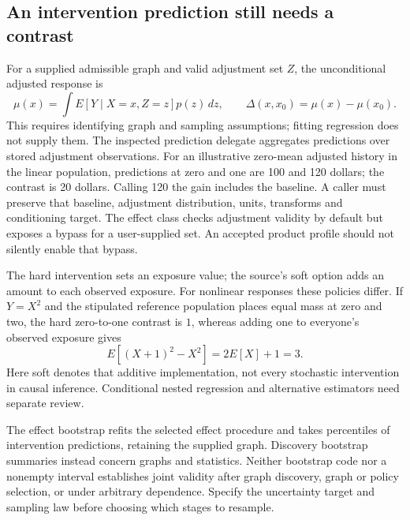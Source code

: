 \subsection{An intervention prediction still needs a contrast}
\label{exec23:tigramite-intervention}
For a supplied admissible graph and valid adjustment set $Z$, the unconditional adjusted response is
\begin{equation}
 \mu(x)=\int E[Y\mid X=x,Z=z]p(z)\,dz,\qquad
 \Delta(x,x_0)=\mu(x)-\mu(x_0).
 \label{exec23:tigramite-contrast}
\end{equation}
This requires identifying graph and sampling assumptions; fitting regression does not supply them. The inspected prediction delegate aggregates predictions over stored adjustment observations. For an illustrative zero-mean adjusted history in the linear population, predictions at zero and one are 100 and 120 dollars; the contrast is 20 dollars. Calling 120 the gain includes the baseline. A caller must preserve that baseline, adjustment distribution, units, transforms and conditioning target. The effect class checks adjustment validity by default but exposes a bypass for a user-supplied set. An accepted product profile should not silently enable that bypass. \cite{exec23_tigramite_reuse_source,exec23_tigramite_reference}

The hard intervention sets an exposure value; the source's soft option adds an amount to each observed exposure. For nonlinear responses these policies differ. If $Y=X^2$ and the stipulated reference population places equal mass at zero and two, the hard zero-to-one contrast is $1$, whereas adding one to everyone's observed exposure gives
\begin{equation}
 E[(X+1)^2-X^2]=2E[X]+1=3.
 \label{exec23:tigramite-policy}
\end{equation}
Here soft denotes that additive implementation, not every stochastic intervention in causal inference. Conditional nested regression and alternative estimators need separate review. \cite{exec23_tigramite_reuse_source,exec23_tigramite_reference}

The effect bootstrap refits the selected effect procedure and takes percentiles of intervention predictions, retaining the supplied graph. Discovery bootstrap summaries instead concern graphs and statistics. Neither bootstrap code nor a nonempty interval establishes joint validity after graph discovery, graph or policy selection, or under arbitrary dependence. Specify the uncertainty target and sampling law before choosing which stages to resample. \cite{exec23_tigramite_reuse_source}

